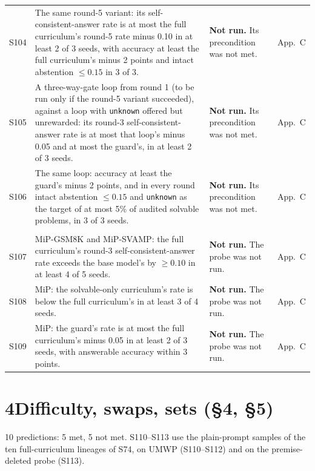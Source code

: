 \documentclass[10pt,a4paper]{article}
\makeatletter
\newcommand{\unk}{\texttt{unknown}}
\newcommand{\nrun}{\textbf{Not run.}}
\newcommand{\sub}[1]{\multicolumn{4}{@{}l}{\emph{#1}}\\\addlinespace[1pt]}
\makeatother
\begin{document}
\begin{longtable}{@{}L{0.9cm}L{7.8cm}L{6.1cm}L{1.3cm}@{}}
S104 & The same round-5 variant: its self-consistent-answer rate is at most the full curriculum's round-5 rate minus 0.10 in at least 2 of 3 seeds, with accuracy at least the full curriculum's minus 2 points and intact abstention $\le 0.15$ in 3 of 3. & \nrun{} Its precondition was not met. & App.~C \\
S105 & A three-way-gate loop from round 1 (to be run only if the round-5 variant succeeded), against a loop with \unk{} offered but unrewarded: its round-3 self-consistent-answer rate is at most that loop's minus 0.05 and at most the guard's, in at least 2 of 3 seeds. & \nrun{} Its precondition was not met. & App.~C \\
S106 & The same loop: accuracy at least the guard's minus 2 points, and in every round intact abstention $\le 0.15$ and \unk{} as the target of at most 5\% of audited solvable problems, in 3 of 3 seeds. & \nrun{} Its precondition was not met. & App.~C \\
\addlinespace[2pt]
\sub{MiP}
S107 & MiP-GSM8K and MiP-SVAMP: the full curriculum's round-3 self-consistent-answer rate exceeds the base model's by $\ge 0.10$ in at least 4 of 5 seeds. & \nrun{} The probe was not run. & App.~C \\
S108 & MiP: the solvable-only curriculum's rate is below the full curriculum's in at least 3 of 4 seeds. & \nrun{} The probe was not run. & App.~C \\
S109 & MiP: the guard's rate is at most the full curriculum's minus 0.05 in at least 2 of 3 seeds, with answerable accuracy within 3 points. & \nrun{} The probe was not run. & App.~C \\
\end{longtable}
\endgroup

\section*{4\quad Difficulty, swaps, sets (\S4, \S5)}
10 predictions: 5 met, 5 not met. S110--S113 use the plain-prompt samples of the ten full-curriculum lineages of S74, on UMWP (S110--S112) and on the premise-deleted probe (S113).
\end{document}
